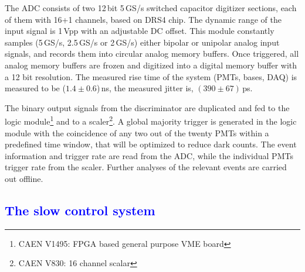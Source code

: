The ADC consists of two 12\,bit 5\,GS/s switched capacitor digitizer sections, 
each of them with 16+1 channels, based on DRS4 chip. The dynamic range of the input signal is 1\,Vpp with an adjustable DC offset. This module constantly samples (5\,GS/s, 2.5\,GS/s or 2\,GS/s) either bipolar or unipolar analog input 
signals, and records them into circular 
analog memory buffers. Once triggered, all analog memory 
buffers are frozen and digitized into a digital memory buffer 
with a 12 bit resolution. The measured rise time of the system (PMTs, bases, DAQ) is measured to be ($1.4 \pm 0.6$)\,ns, the measured jitter is, $(390 \pm 67)$\,ps. 

The binary output signals from the discriminator are duplicated and fed to 
the logic module\footnote{CAEN V1495: FPGA based general purpose VME board} and to a scaler\footnote{CAEN V830: 16 channel scalar}. 
A global majority trigger is generated in the logic module with the coincidence of any two out of the twenty PMTs within a predefined time window, that will be optimized to reduce dark counts. The event information and trigger rate are read from the ADC, while the individual PMTs trigger rate from the scaler. Further analyses of the relevant events are carried out offline.

\subsection{\textcolor{blue}{The slow control system}}
\label{subsec:sc}

